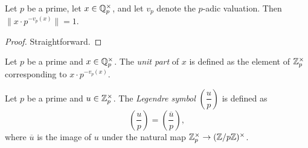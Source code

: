 \begin{lemma}\label{lem:padic_unit_part_unit}
\leanok
Let $p$ be a prime, let $x \in \mathbb{Q}_p^\times$, and let $v_p$ denote the $p$-adic valuation. Then $\|x \cdot p^{-v_p(x)}\| = 1$.
\end{lemma}
\begin{proof}
\leanok
Straightforward.
\end{proof}

\begin{definition}\label{def:padicUnitPart}
  \leanok
Let $p$ be a prime and $x \in \mathbb{Q}_p^\times$. The \emph{unit part} of $x$ is defined as the element
of $\mathbb{Z}_p^\times$ corresponding to $x \cdot p^{-v_p(x)}$.
\end{definition}

\begin{definition}\label{def:legendreSym}
  \leanok
Let $p$ be a prime and $u \in \mathbb{Z}_p^\times$. The \emph{Legendre symbol} $\left(\dfrac{u}{p}\right)$
is defined as
\[\left(\dfrac{u}{p}\right)=\left(\dfrac{\overline{u}}{p}\right),\]
where $\overline{u}$ is the image of $u$ under the natural map $\mathbb{Z}_p^\times \to (\mathbb{Z}/p\mathbb{Z})^\times$.
\end{definition}
